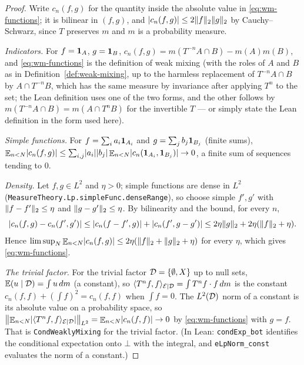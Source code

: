 \begin{proof}
  Write $c_n(f,g)$ for the quantity inside the absolute value in \eqref{eq:wm-functions}; it is
  bilinear in $(f,g)$, and $\lvert c_n(f,g) \rvert \leq 2\lVert f \rVert_2\lVert g \rVert_2$ by Cauchy--Schwarz, since
  $T$ preserves $m$ and $m$ is a probability measure.

  \emph{Indicators.}  For $f = \mathbf{1}_A$, $g = \mathbf{1}_B$, $c_n(f,g) = m(T^{-n}A \cap B) - m(A)m(B)$,
  and \eqref{eq:wm-functions} is the definition of weak mixing (with the roles of $A$ and $B$
  as in Definition~\ref{def:weak-mixing}, up to the harmless replacement of $T^{-n}A \cap B$ by
  $A \cap T^{-n}B$, which has the same measure by invariance after applying $T^n$ to the set;
  the Lean definition uses one of the two forms, and the other follows by
  $m(T^{-n}A \cap B) = m(A \cap T^{n}B)$ for the invertible $T$ --- or simply state the Lean
  definition in the form used here).

  \emph{Simple functions.}  For $f = \sum_i a_i \mathbf{1}_{A_i}$ and $g = \sum_j b_j \mathbf{1}_{B_j}$
  (finite sums),
  $\mathop{\mathbb{E}}_{n<N}\lvert c_n(f,g) \rvert \leq \sum_{i,j}\lvert a_i \rvert\lvert b_j \rvert\mathop{\mathbb{E}}_{n<N}\lvert c_n(\mathbf{1}_{A_i},\mathbf{1}_{B_j}) \rvert \to 0$,
  a finite sum of sequences tending to $0$.

  \emph{Density.}  Let $f, g \in L^2$ and $\eta > 0$; simple functions are dense in $L^2$
  (\texttt{MeasureTheory.Lp.simpleFunc.denseRange}), so choose simple $f', g'$ with
  $\lVert f - f' \rVert_2 \leq \eta$ and $\lVert g - g' \rVert_2 \leq \eta$.  By bilinearity and the bound,
  for every $n$,
  \[
    \lvert c_n(f,g) - c_n(f',g') \rvert \leq \lvert c_n(f-f',g) \rvert + \lvert c_n(f',g-g') \rvert
      \leq 2\eta\lVert g \rVert_2 + 2\eta(\lVert f \rVert_2 + \eta) .
  \]
  Hence $\limsup_N \mathop{\mathbb{E}}_{n<N}\lvert c_n(f,g) \rvert \leq 2\eta(\lVert f \rVert_2 + \lVert g \rVert_2 + \eta)$ for every
  $\eta$, which gives \eqref{eq:wm-functions}.

  \emph{The trivial factor.}  For the trivial factor $\mathcal{D} = \{\emptyset, X\}$ up to null sets,
  $\mathbb{E}(u \mid \mathcal{D}) = \int u\,dm$ (a constant), so $\langle T^nf, f \rangle_{\mathcal{E} \mid \mathcal{D}} = \int T^nf \cdot f\,dm$ is
  the constant $c_n(f,f) + (\int f)^2 = c_n(f,f)$ when $\int f = 0$.  The $L^2(\mathcal{D})$ norm of a
  constant is its absolute value on a probability space, so
  $\bigl\lVert \mathop{\mathbb{E}}_{n<N}\lvert \langle T^nf, f \rangle_{\mathcal{E} \mid \mathcal{D}} \rvert \bigr\rVert_{L^2} = \mathop{\mathbb{E}}_{n<N}\lvert c_n(f,f) \rvert \to 0$ by
  \eqref{eq:wm-functions} with $g = f$.  That is \texttt{CondWeaklyMixing} for the trivial
  factor.  (In Lean: \texttt{condExp\_bot} identifies the conditional expectation onto $\bot$
  with the integral, and \texttt{eLpNorm\_const} evaluates the norm of a constant.)
\end{proof}

